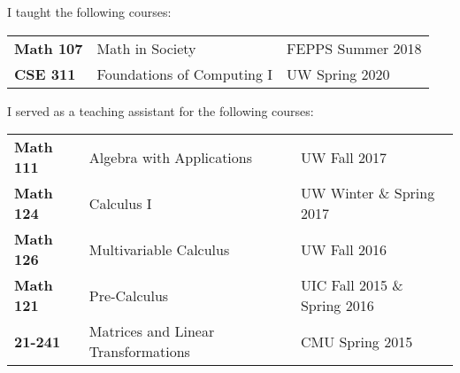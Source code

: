 \documentclass[12 pt]{article}
\newcommand{\lineunder}{\vspace*{-8pt} \\ \hspace*{-18pt} \hrulefill \\}
\newcommand{\header}[1]{{\hspace*{-15pt}\vspace*{6pt} \selectfont{\textsc{#1}}} \vspace*{-6pt} \lineunder}
\newcommand{\employer}[3]{{ \textbf{#1} \hfill #2 \\ #3\\  }}
\begin{document}









\clearpage

\header{Teaching}

I taught the following courses:
\begin{center}
	\begin{tabular}{ l l l }
	  \textbf{Math 107}& Math in Society & FEPPS Summer 2018 \\ 
	  \textbf{CSE 311}&	 Foundations of Computing I & UW Spring 2020 	
	\end{tabular}
\end{center}

I served as a teaching assistant for the following courses:
\begin{center}
	\begin{tabular}{ l l l }
	  \textbf{Math 111}& Algebra with Applications & UW Fall 2017 \\ 
	  \textbf{Math 124}&	 Calculus I & UW Winter  \& Spring 2017  \\  
	 \textbf{Math 126} &    Multivariable Calculus   & UW Fall 2016    \\
	\textbf{Math 121}	& Pre-Calculus	& UIC Fall 2015 \& Spring 2016\\	
	\textbf{21-241}	&	Matrices and Linear Transformations & CMU Spring 2015 	
	\end{tabular}
\end{center}

\end{document}
